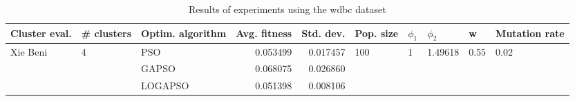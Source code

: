 \begin{table}
\centering
\caption{Results of experiments using the wdbc dataset}
\begin{tabular}{lllrrlllll}
\toprule
            Cluster eval. &        \# clusters & Optim. algorithm &  Avg. fitness &  Std. dev. &            Pop. size &         $\phi_{1}$ &               $\phi_{2}$ &                     w &         Mutation rate \\
\midrule
\multirow{3}{*}{Xie Beni} & \multirow{3}{*}{4} &              PSO &      0.053499 &   0.017457 & \multirow{3}{*}{100} & \multirow{3}{*}{1} & \multirow{3}{*}{1.49618} & \multirow{3}{*}{0.55} & \multirow{3}{*}{0.02} \\
                          &                    &            GAPSO &      0.068075 &   0.026860 &                      &                    &                          &                       &                       \\
                          &                    &          LOGAPSO &      0.051398 &   0.008106 &                      &                    &                          &                       &                       \\
\bottomrule
\end{tabular}
\end{table}
